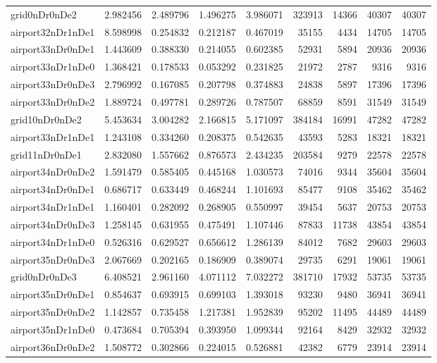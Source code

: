 \begin{longtable}{|l|r|r|r|r|r|r|r|r|}
grid0nDr0nDe2 & 2.982456 & 2.489796 & 1.496275 & 3.986071 & 323913 & 14366 & 40307 & 40307 \\
airport32nDr1nDe1 & 8.598998 & 0.254832 & 0.212187 & 0.467019 & 35155 & 4434 & 14705 & 14705 \\
airport33nDr0nDe1 & 1.443609 & 0.388330 & 0.214055 & 0.602385 & 52931 & 5894 & 20936 & 20936 \\
airport33nDr1nDe0 & 1.368421 & 0.178533 & 0.053292 & 0.231825 & 21972 & 2787 & 9316 & 9316 \\
airport33nDr0nDe3 & 2.796992 & 0.167085 & 0.207798 & 0.374883 & 24838 & 5897 & 17396 & 17396 \\
airport33nDr0nDe2 & 1.889724 & 0.497781 & 0.289726 & 0.787507 & 68859 & 8591 & 31549 & 31549 \\
grid10nDr0nDe2 & 5.453634 & 3.004282 & 2.166815 & 5.171097 & 384184 & 16991 & 47282 & 47282 \\
airport33nDr1nDe1 & 1.243108 & 0.334260 & 0.208375 & 0.542635 & 43593 & 5283 & 18321 & 18321 \\
grid11nDr0nDe1 & 2.832080 & 1.557662 & 0.876573 & 2.434235 & 203584 & 9279 & 22578 & 22578 \\
airport34nDr0nDe2 & 1.591479 & 0.585405 & 0.445168 & 1.030573 & 74016 & 9344 & 35604 & 35604 \\
airport34nDr0nDe1 & 0.686717 & 0.633449 & 0.468244 & 1.101693 & 85477 & 9108 & 35462 & 35462 \\
airport34nDr1nDe1 & 1.160401 & 0.282092 & 0.268905 & 0.550997 & 39454 & 5637 & 20753 & 20753 \\
airport34nDr0nDe3 & 1.258145 & 0.631955 & 0.475491 & 1.107446 & 87833 & 11738 & 43854 & 43854 \\
airport34nDr1nDe0 & 0.526316 & 0.629527 & 0.656612 & 1.286139 & 84012 & 7682 & 29603 & 29603 \\
airport35nDr0nDe3 & 2.067669 & 0.202165 & 0.186909 & 0.389074 & 29735 & 6291 & 19061 & 19061 \\
grid0nDr0nDe3 & 6.408521 & 2.961160 & 4.071112 & 7.032272 & 381710 & 17932 & 53735 & 53735 \\
airport35nDr0nDe1 & 0.854637 & 0.693915 & 0.699103 & 1.393018 & 93230 & 9480 & 36941 & 36941 \\
airport35nDr0nDe2 & 1.142857 & 0.735458 & 1.217381 & 1.952839 & 95202 & 11495 & 44489 & 44489 \\
airport35nDr1nDe0 & 0.473684 & 0.705394 & 0.393950 & 1.099344 & 92164 & 8429 & 32932 & 32932 \\
airport36nDr0nDe2 & 1.508772 & 0.302866 & 0.224015 & 0.526881 & 42382 & 6779 & 23914 & 23914 \\

\end{longtable}
